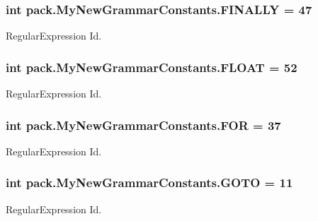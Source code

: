 \subsubsection[{\texorpdfstring{F\+I\+N\+A\+L\+LY}{FINALLY}}]{\setlength{\rightskip}{0pt plus 5cm}int pack.\+My\+New\+Grammar\+Constants.\+F\+I\+N\+A\+L\+LY = 47}\hypertarget{interfacepack_1_1_my_new_grammar_constants_ab31f19e59d93546025aaeb5e6ddfa9cc}{}\label{interfacepack_1_1_my_new_grammar_constants_ab31f19e59d93546025aaeb5e6ddfa9cc}
Regular\+Expression Id. 
\subsubsection[{\texorpdfstring{F\+L\+O\+AT}{FLOAT}}]{\setlength{\rightskip}{0pt plus 5cm}int pack.\+My\+New\+Grammar\+Constants.\+F\+L\+O\+AT = 52}\hypertarget{interfacepack_1_1_my_new_grammar_constants_a27a815b68bf2c833acdc02fd3812502a}{}\label{interfacepack_1_1_my_new_grammar_constants_a27a815b68bf2c833acdc02fd3812502a}
Regular\+Expression Id. 
\subsubsection[{\texorpdfstring{F\+OR}{FOR}}]{\setlength{\rightskip}{0pt plus 5cm}int pack.\+My\+New\+Grammar\+Constants.\+F\+OR = 37}\hypertarget{interfacepack_1_1_my_new_grammar_constants_a260ae7d2aaaa8a8f5cbf785e3d925c5b}{}\label{interfacepack_1_1_my_new_grammar_constants_a260ae7d2aaaa8a8f5cbf785e3d925c5b}
Regular\+Expression Id. 
\subsubsection[{\texorpdfstring{G\+O\+TO}{GOTO}}]{\setlength{\rightskip}{0pt plus 5cm}int pack.\+My\+New\+Grammar\+Constants.\+G\+O\+TO = 11}\hypertarget{interfacepack_1_1_my_new_grammar_constants_af19e4cd6c9d385af5656e80b5bcfcc75}{}\label{interfacepack_1_1_my_new_grammar_constants_af19e4cd6c9d385af5656e80b5bcfcc75}
Regular\+Expression Id. 
